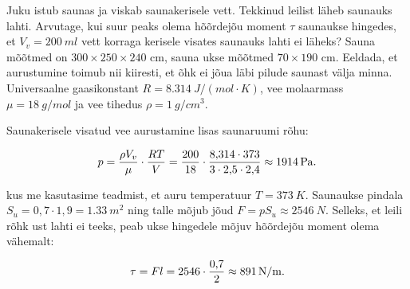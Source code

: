 \setAuthor{}

Juku istub saunas ja viskab saunakerisele vett. Tekkinud leilist läheb saunauks lahti. Arvutage, kui suur peaks olema hõõrdejõu moment $\tau$ saunaukse hingedes, et $V_v=\SI{200}{ml}$ vett korraga kerisele visates saunauks lahti ei läheks? Sauna mõõtmed on $300 \times 250 \times 240$ cm, sauna ukse mõõtmed $70 \times 190$ cm. Eeldada, et aurustumine toimub nii kiiresti, et õhk ei jõua läbi pilude saunast välja minna. Universaalne gaasikonstant $R=\SI{8,314}{J/(mol \cdot K)}$, vee molaarmass $\mu=\SI{18}{g/mol}$ ja vee tihedus $\rho = \SI{1}{g/cm^3}$. 

\hint

\solu
Saunakerisele visatud vee aurustamine lisas saunaruumi rõhu: 

\[ p = {\rho V_v  \over \mu} \cdot {RT\over V} = {200 \over 18} \cdot {8,\!314 \cdot 373 \over 3\cdot2,\!5\cdot2,\!4} \approx \SI{1914}{Pa}. \] 

kus me kasutasime teadmist, et auru temperatuur $T=\SI{373}{K}$. Saunaukse pindala $S_u = 0,\!7 \cdot 1,\!9 = \SI{1,33}{m^2}$ ning talle mõjub jõud $F = p S_u \approx \SI{2546}{N}$.
Selleks, et leili rõhk ust lahti ei teeks, peab ukse hingedele mõjuv hõõrdejõu moment olema vähemalt:

\[ \tau = { F l } = { 2546 \cdot {0,\!7 \over 2 } } \approx \SI{891}{N/m}.\]
\probend